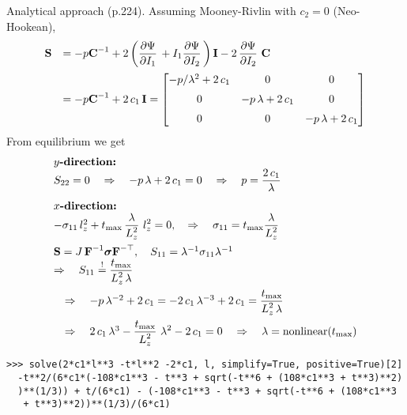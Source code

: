 Analytical approach (p.224). Assuming Mooney-Rivlin with $c_2 = 0$ (Neo-Hookean),
\begin{equation*}
  \begin{array}{lll}
    \bfS &= -p\bfC^{-1} + 2\left(\p{\Psi}{I_1} + I_1\p{\Psi}{I_2}\right)\bfI - 2\,\p{\Psi}{I_2}\,\bfC\\[4mm]
     &= -p\bfC^{-1} + 2\,c_1\,\bfI =
      \matt{-p/\lambda^2 + 2\,c_1 & 0 & 0\\[2mm] 
     0 & -p\,\lambda + 2\,c_1 & 0\\[2mm]
     0 & 0 & -p\,\lambda + 2\,c_1}
  \end{array}
\end{equation*}
From equilibrium we get
\begin{equation*}
  \begin{array}{lll}
    \textbf{$y$-direction:}\\
    S_{22} = 0 \quad \Rightarrow \quad -p\,\lambda + 2\,c_1 = 0 \quad \Rightarrow \quad p = \displaystyle\frac{\displaystyle{2\,c_1}}{\displaystyle{\lambda}}\,\\[4mm]
    
    \textbf{$x$-direction:}\\
    -\sigma_{11}\,l_z^2 + t_\text{max}\,\displaystyle\frac{\displaystyle{\lambda}}{\displaystyle{L_z^2}}\,\,l_z^2 = 0,\quad \Rightarrow \quad 
    \sigma_{11} = t_\text{max}\displaystyle\frac{\displaystyle{\lambda}}{\displaystyle{L_z^2}}\,\\[4mm]
    \textbf{S} = J\,\textbf{F}^{-1} \boldsymbol{\sigma} \textbf{F}^{-\top}, \quad 
    S_{11} = \lambda^{-1} \sigma_{11} \lambda^{-1}\\
    \Rightarrow \quad S_{11} \overset{!}{=} \displaystyle\frac{\displaystyle{t_\text{max}}}{\displaystyle{L_z^2\,\lambda}}\,\\[4mm]
    \quad \Rightarrow \quad -p\,\lambda^{-2} + 2\,c_1 = -2\,c_1\,\lambda^{-3} + 2\,c_1 = \displaystyle\frac{\displaystyle{t_\text{max}}}{\displaystyle{L_z^2\,\lambda}}\,\\[4mm]
    \quad \Rightarrow \quad 2\,c_1\,\lambda^{3} - \displaystyle\frac{\displaystyle{t_\text{max}}}{\displaystyle{L_z^2}}\,\,\lambda^2 -2\,c_1 = 0
    \quad \Rightarrow \quad \lambda = \text{nonlinear($t_\text{max}$)}
  \end{array}
\end{equation*}
\begin{lstlisting}[columns=fixed,basicstyle=\ttfamily]
  >>> solve(2*c1*l**3 -t*l**2 -2*c1, l, simplify=True, positive=True)[2]
  -t**2/(6*c1*(-108*c1**3 - t**3 + sqrt(-t**6 + (108*c1**3 + t**3)**2)
  )**(1/3)) + t/(6*c1) - (-108*c1**3 - t**3 + sqrt(-t**6 + (108*c1**3
   + t**3)**2))**(1/3)/(6*c1)
\end{lstlisting}
